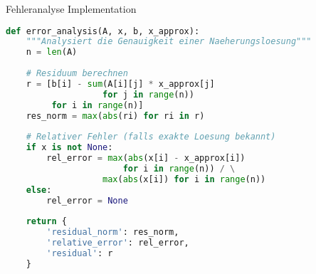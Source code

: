 \begin{examplecode}{Fehleranalyse Implementation}
\begin{lstlisting}[language=Python, style=basesmol]
def error_analysis(A, x, b, x_approx):
    """Analysiert die Genauigkeit einer Naeherungsloesung"""
    n = len(A)
    
    # Residuum berechnen
    r = [b[i] - sum(A[i][j] * x_approx[j] 
                   for j in range(n)) 
         for i in range(n)]
    res_norm = max(abs(ri) for ri in r)
    
    # Relativer Fehler (falls exakte Loesung bekannt)
    if x is not None:
        rel_error = max(abs(x[i] - x_approx[i]) 
                       for i in range(n)) / \
                   max(abs(x[i]) for i in range(n))
    else:
        rel_error = None
    
    return {
        'residual_norm': res_norm,
        'relative_error': rel_error,
        'residual': r
    }
\end{lstlisting}
\end{examplecode}

